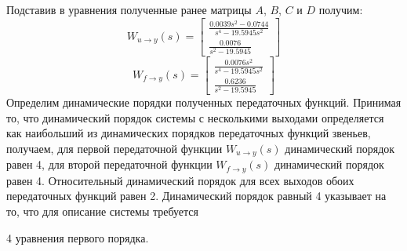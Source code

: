 Подставив в уравнения полученные ранее матрицы $A$, $B$, $C$ и $D$ получим: 
\begin{equation}
    W_{u \rightarrow y}(s) = \begin{bmatrix}
    \frac{0.0039s^2 - 0.0744}{s^4 - 19.5945s^2} \\ 
    \frac{0.0076}{s^2 - 19.5945}
    \end{bmatrix}
\end{equation}
\begin{equation}
    W_{f \rightarrow y}(s) = \begin{bmatrix}
    \frac{0.0076s^2}{s^4 - 19.5945s^2} \\ 
    \frac{0.6236}{s^2 - 19.5945}
    \end{bmatrix}
\end{equation}
Определим динамические порядки полученных передаточных функций. 
Принимая то, что динамический порядок системы с несколькими выходами определяется как 
наибольший из динамических порядков передаточных функций звеньев, получаем, 
для первой передаточной функции $W_{u \rightarrow y}(s)$ динамический порядок равен 4, 
для второй передаточной функции $W_{f \rightarrow y}(s)$ динамический порядок равен 4. 
Относительный динамический порядок для всех выходов обоих передаточных функций равен 2. 
Динамический порядок равный 4 указывает на то, что для описание системы требуется 

4 уравнения первого порядка. 

